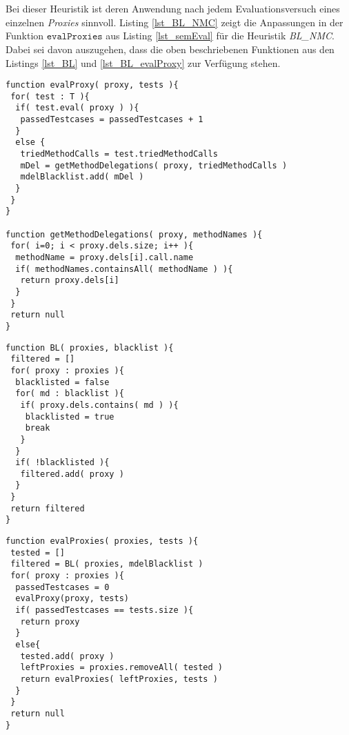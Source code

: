 \\\\
Bei dieser \Gls{Heuristik} ist deren Anwendung nach jedem Evaluationsversuch eines einzelnen \emph{Proxies} sinnvoll. Listing \ref{lst_BL_NMC} zeigt die Anpassungen in der Funktion $\texttt{evalProxies}$ aus Listing \ref{lst_semEval} für die Heuristik \emph{BL\_NMC}. Dabei sei davon auszugehen, dass die oben beschriebenen Funktionen aus den Listings \ref{lst_BL} und \ref{lst_BL_evalProxy} zur Verfügung stehen.
\begin{lstlisting}[style = pseudo, caption = Evaluierung einzelner Proxies mit \emph{BL\_MNC}, captionpos = b, label = lst_BL_evalProxy]
function evalProxy( proxy, tests ){
 for( test : T ){	
  if( test.eval( proxy ) ){
   passedTestcases = passedTestcases + 1
  }
  else {
   triedMethodCalls = test.triedMethodCalls
   mDel = getMethodDelegations( proxy, triedMethodCalls )
   mdelBlacklist.add( mDel )
  }		
 }
}

function getMethodDelegations( proxy, methodNames ){
 for( i=0; i < proxy.dels.size; i++ ){
  methodName = proxy.dels[i].call.name
  if( methodNames.containsAll( methodName ) ){
   return proxy.dels[i]
  }
 }
 return null
}
\end{lstlisting}
\begin{lstlisting}[style = pseudo, label = lst_BL, caption=Blacklist-Methode für Heuristik \emph{BL\_NMC}, captionpos = b]
function BL( proxies, blacklist ){
 filtered = []	
 for( proxy : proxies ){
  blacklisted = false
  for( md : blacklist ){
   if( proxy.dels.contains( md ) ){
    blacklisted = true
    break
   }	
  }
  if( !blacklisted ){
   filtered.add( proxy )
  }
 }
 return filtered
}

\end{lstlisting}
\noindent

\begin{lstlisting}[style = pseudo, caption=Evaluation mehrere Proxies mit \emph{BL\_MNC}, captionpos=b, label = lst_BL_NMC]
function evalProxies( proxies, tests ){
 tested = []
 filtered = BL( proxies, mdelBlacklist )
 for( proxy : proxies ){
  passedTestcases = 0
  evalProxy(proxy, tests)
  if( passedTestcases == tests.size ){
   return proxy
  }
  else{
   tested.add( proxy )
   leftProxies = proxies.removeAll( tested )	
   return evalProxies( leftProxies, tests )
  }
 }
 return null
}
\end{lstlisting}
\noindent